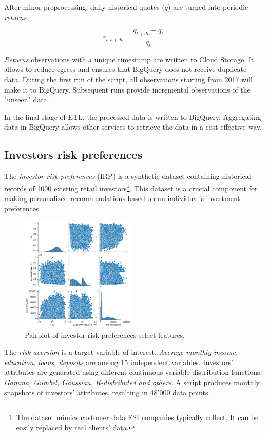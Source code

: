 \documentclass[twocolumn]{article}
\begin{document}
    After minor preprocessing, daily historical quotes ($q$) are turned into periodic \emph{returns}.

    \begin{equation}
        {r_{t, t + dt} = \frac{q_{t + dt} - q_{t}}{q_{t}}}
    \end{equation}

    \emph{Returns} observations with a unique timestamp are written to Cloud Storage.
    It allows to reduce egress and ensures that BigQuery does not receive duplicate data.
    During the first run of the script, all observations starting from 2017 will make it to BigQuery.
    Subsequent runs provide incremental observations of the "unseen" data.

    In the final stage of ETL, the processed data is written to BigQuery.
    Aggregating data in BigQuery allows other services to retrieve the data in a cost-effective way.

\subsection{Investors risk preferences}
    The \emph{investor risk preferences} (IRP) is a synthetic dataset containing historical records of 1000 existing retail investors\footnote{The dataset mimics customer data FSI companies typically collect. It can be easily replaced by real clients' data.}.
    This dataset is a crucial component for making personalized recommendations based on an individual's investment preferences.

    \begin{figure}
        \includegraphics[width=0.49\textwidth]{media/irp-pairplot.png}
        \caption{Pairplot of investor risk preferences select features.}
    \end{figure}

    The \emph{risk aversion} is a target variable of interest.
    \emph{Average monthly income, education, loans, deposits} are among 15 independent variables.
    Investors' attributes are generated using different continuous variable distribution functions: \emph{Gamma, Gumbel, Gaussian, R-distributed and others}.
    A script produces monthly snapshots of investors' attributes, resulting in 48'000 data points.
\end{document}
